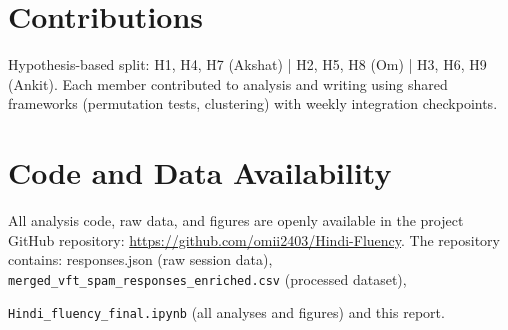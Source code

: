 \documentclass[12pt]{article}
\begin{document}
\section{Contributions}
Hypothesis-based split: H1, H4, H7 (Akshat) | H2, H5, H8 (Om) | H3, H6, H9 (Ankit). Each member contributed to analysis and writing using shared frameworks (permutation tests, clustering) with weekly integration checkpoints.

\section*{Code and Data Availability}
All analysis code, raw data, and figures are openly available in the project GitHub repository: \url{https://github.com/omii2403/Hindi-Fluency}. The repository contains: responses.json (raw session data), \texttt{merged\_vft\_spam\_responses\_enriched.csv} (processed dataset), 

\texttt{Hindi\_fluency\_final.ipynb} (all analyses and figures) and this report.





\end{document}
